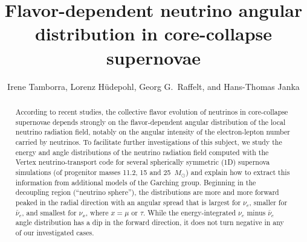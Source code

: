\documentclass[iop,twocolappendix,numberedappendix]{emulateapj}
\begin{document}
\title{Flavor-dependent neutrino angular distribution in core-collapse supernovae}



\author{Irene Tamborra,
 Lorenz H\"udepohl, 
 Georg G.~Raffelt,
 and
 Hans-Thomas Janka
 }



\begin{abstract}
According to recent studies, the collective flavor evolution of neutrinos
in core-collapse supernovae depends strongly on the flavor-dependent
angular distribution of the local neutrino radiation field, notably on the
angular intensity of the electron-lepton number carried by neutrinos. To
facilitate further investigations of this subject, we study the energy and
angle distributions of the neutrino radiation field computed with
the {\sc Vertex} neutrino-transport code for several spherically symmetric (1D)
supernova simulations (of progenitor masses 11.2, 15 and 25~$M_{\odot}$)
and explain how to extract this information from additional models of the
Garching group. Beginning in the decoupling region (``neutrino sphere''),
the distributions are more and more forward peaked in the radial direction
with an angular spread that is largest for $\nu_e$, smaller for
$\bar\nu_e$, and smallest for $\nu_x$, where $x=\mu$ or $\tau$.  While the
energy-integrated $\nu_e$ minus $\bar\nu_e$ angle distribution has a dip in
the forward direction, it does not turn negative in any of our investigated
cases.
\end{abstract}


\end{document}
